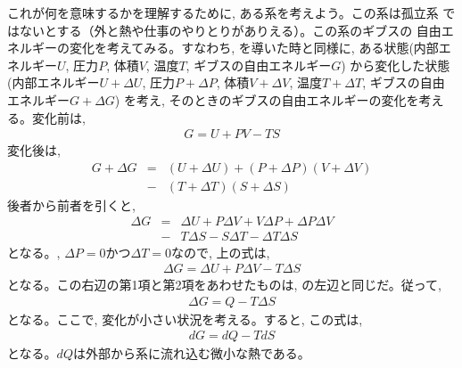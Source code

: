 これが何を意味するかを理解するために, ある系を考えよう。この系は孤立系
ではないとする（外と熱や仕事のやりとりがありえる）。この系のギブスの
自由エネルギーの変化を考えてみる。すなわち, 
を導いた時と同様に, 
ある状態(内部エネルギー$U$, 圧力$P$, 体積$V$, 温度$T$, ギブスの自由エネルギー$G$)
から変化した状態(内部エネルギー$U+\Delta U$, 圧力$P+\Delta P$, 体積$V+\Delta V$, 
温度$T+\Delta T$, ギブスの自由エネルギー$G+\Delta G$)
を考え, そのときのギブスの自由エネルギーの変化を考える。変化前は, 
\begin{eqnarray}
G=U+PV-TS
\end{eqnarray}
変化後は, 
\begin{eqnarray}
G+\Delta G&=&(U+\Delta U)+(P+\Delta P)(V+\Delta V)\nonumber\\
          &-&(T+\Delta T)(S+\Delta S)
\end{eqnarray}
後者から前者を引くと, 
\begin{eqnarray}
\Delta G&=&\Delta U+P\Delta V+V\Delta P+\Delta P\Delta V\nonumber\\
        &-&T\Delta S-S\Delta T-\Delta T\Delta S
\end{eqnarray}
となる。, $\Delta P=0$かつ$\Delta T=0$なので, 上の式は, 
\begin{eqnarray}
\Delta G=\Delta U+P\Delta V-T\Delta S
\end{eqnarray}
となる。この右辺の第1項と第2項をあわせたものは, の左辺と同じだ。従って, 
\begin{eqnarray}
\Delta G=Q-T\Delta S
\end{eqnarray}
となる。ここで, 変化が小さい状況を考える。すると, この式は, 
\begin{eqnarray}
dG=dQ-TdS\label{eq:dGdQTdS}
\end{eqnarray}
となる。$dQ$は外部から系に流れ込む微小な熱である。

